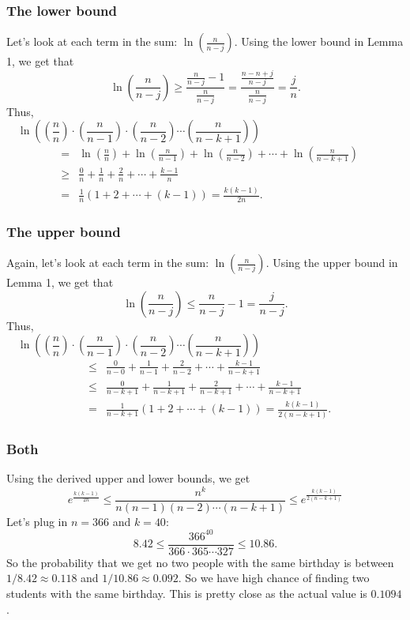 \begin{frame}\frametitle{The lower bound }
  Let's look at each term in the sum: $\ln\left(\frac{n}{n-j}\right)$.
  Using the lower bound in Lemma 1, we get that
  \[
  \ln\left(\frac{n}{n-j}\right)
  \geq \frac{\frac{n}{n-j}-1}{\frac{n}{n-j}}
  = \frac{\frac{n-n+j}{n-j}}{\frac{n}{n-j}}
  = \frac{j}{n}.
  \]
  \pause
  Thus,
  \[
  \ln\left(\left(\frac{n}{n}\right)\cdot
  \left(\frac{n}{n-1}\right)\cdot\left(\frac{n}{n-2}\right)
  \cdots\left(\frac{n}{n-k+1}\right)\right)
  \qquad\qquad\qquad\qquad\qquad\qquad
  \]
  \begin{eqnarray*}
  &=& \ln\left(\frac{n}{n}\right)+
  \ln\left(\frac{n}{n-1}\right)+\ln\left(\frac{n}{n-2}\right) +
  \cdots+\ln\left(\frac{n}{n-k+1}\right)\\
  &\geq& \frac{0}{n}+\frac{1}{n}+\frac{2}{n}+\cdots+\frac{k-1}{n}\\
  &=& \frac{1}{n}\left(1+2+\cdots+(k-1)\right) = \frac{k(k-1)}{2n}.
  \end{eqnarray*}
\end{frame}

\begin{frame}\frametitle{The upper bound }
  Again, let's look at each term in the sum:
  $\ln\left(\frac{n}{n-j}\right)$.  Using the upper bound in Lemma 1,
  we get that
  \[
  \ln\left(\frac{n}{n-j}\right)
  \leq \frac{n}{n-j}-1=\frac{j}{n-j}.
  \]
  \pause
  Thus,
  \[
  \ln\left(\left(\frac{n}{n}\right)\cdot
  \left(\frac{n}{n-1}\right)\cdot\left(\frac{n}{n-2}\right)
  \cdots\left(\frac{n}{n-k+1}\right)\right)
  \qquad\qquad\qquad\qquad\qquad\qquad
  \]
  \begin{eqnarray*}
  &\leq& \frac{0}{n-0}+\frac{1}{n-1}+\frac{2}{n-2}+\cdots+\frac{k-1}{n-k+1}\\
  &\leq& \frac{0}{n-k+1}+\frac{1}{n-k+1}+\frac{2}{n-k+1}+\cdots+\frac{k-1}{n-k+1}\\
  &=& \frac{1}{n-k+1}\left(1+2+\cdots+(k-1)\right) = \frac{k(k-1)}{2(n-k+1)}.
  \end{eqnarray*}
\end{frame}

\begin{frame}\frametitle{Both}
  Using the derived upper and lower bounds, we get
  \[
  e^{\frac{k(k-1)}{2n}}\leq
  \frac{n^k}{n(n-1)(n-2)\cdots(n-k+1)}
  \leq e^{\frac{k(k-1)}{2(n-k+1)}}
  \]
  \pause
  Let's plug in $n=366$ and $k=40$:
  \[
  8.42\leq \frac{366^{40}}{366\cdot 365\cdots 327}\leq 10.86.
  \]
  \pause
  So the probability that we get no two people with the same birthday
  is between $1/8.42 \approx 0.118$ and $1/10.86 \approx 0.092$.  So
  we have high chance of finding two students with the same
  birthday. \pause This is pretty close as the actual value is
  $0.1094$.
\end{frame}
